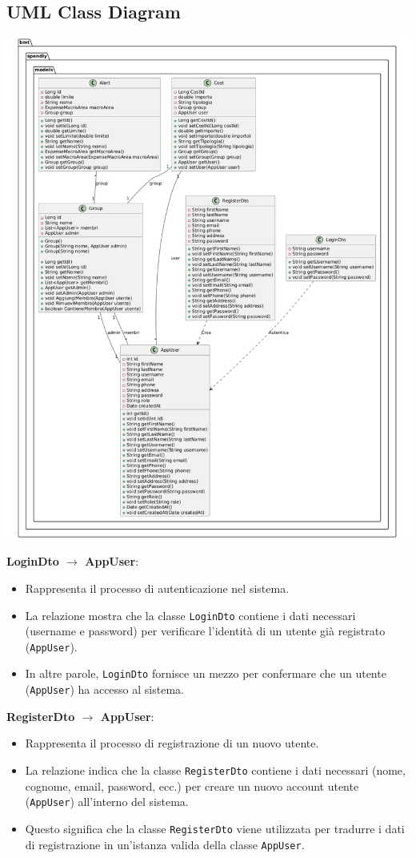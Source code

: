 \subsection{UML Class Diagram}

\begin{center}
    \includegraphics[scale=0.345]{images/ClassDiagram3.png}
\end{center}
\textbf{LoginDto $\rightarrow$ AppUser}: \begin{itemize} \item Rappresenta il processo di autenticazione nel sistema. \item La relazione mostra che la classe \texttt{LoginDto} contiene i dati necessari (username e password) per verificare l'identità di un utente già registrato (\texttt{AppUser}). \item In altre parole, \texttt{LoginDto} fornisce un mezzo per confermare che un utente (\texttt{AppUser}) ha accesso al sistema. \end{itemize}
\textbf{RegisterDto $\rightarrow$ AppUser}: \begin{itemize} \item Rappresenta il processo di registrazione di un nuovo utente. \item La relazione indica che la classe \texttt{RegisterDto} contiene i dati necessari (nome, cognome, email, password, ecc.) per creare un nuovo account utente (\texttt{AppUser}) all'interno del sistema. \item Questo significa che la classe \texttt{RegisterDto} viene utilizzata per tradurre i dati di registrazione in un'istanza valida della classe \texttt{AppUser}. \end{itemize}
